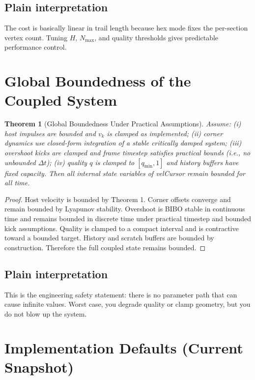 \documentclass[journal]{IEEEtran}
\newtheorem{theorem}{Theorem}
\begin{document}
\subsection{Plain interpretation}
The cost is basically linear in trail length because hex mode fixes the per-section vertex count. Tuning \(H\), \(N_{\max}\), and quality thresholds gives predictable performance control.

\section{Global Boundedness of the Coupled System}

\begin{theorem}[Global Boundedness Under Practical Assumptions]
Assume:
(i) host impulses are bounded and \(v_k\) is clamped as implemented;
(ii) corner dynamics use closed-form integration of a stable critically damped system;
(iii) overshoot kicks are clamped and frame timestep satisfies practical bounds (i.e., no unbounded \(\Delta t\));
(iv) quality \(q\) is clamped to \([q_{\min},1]\) and history buffers have fixed capacity.
Then all internal state variables of velCursor remain bounded for all time.
\end{theorem}

\begin{proof}
Host velocity is bounded by Theorem 1. Corner offsets converge and remain bounded by Lyapunov stability. Overshoot is BIBO stable in continuous time and remains bounded in discrete time under practical timestep and bounded kick assumptions. Quality is clamped to a compact interval and is contractive toward a bounded target. History and scratch buffers are bounded by construction. Therefore the full coupled state remains bounded.
\end{proof}

\subsection{Plain interpretation}
This is the engineering safety statement: there is no parameter path that can cause infinite values. Worst case, you degrade quality or clamp geometry, but you do not blow up the system.

\section{Implementation Defaults (Current Snapshot)}
\end{document}
